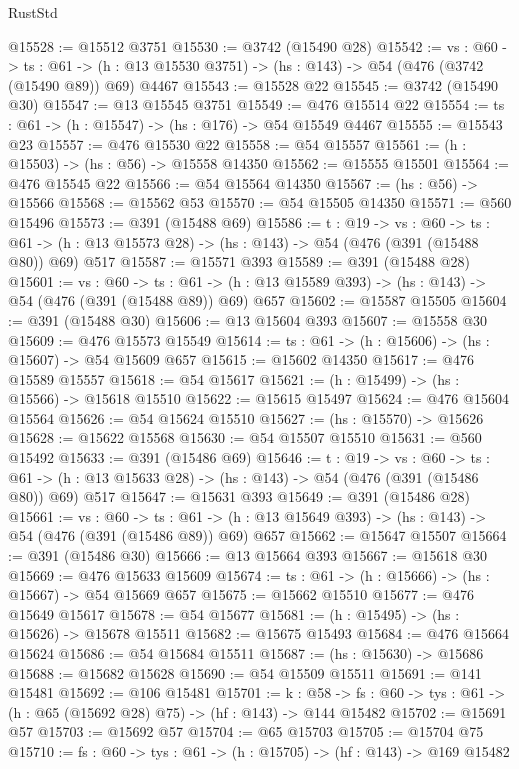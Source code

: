 \begin{lexlean}{RustStd}
\begin{coremodule}
@15528 := @15512 @3751
@15530 := @3742 (@15490 @28)
@15542 := {vs : @60} ->
  {ts : @61} -> (h : @13 @15530 @3751) -> (hs : @143) -> @54 (@476 (@3742 (@15490 @89)) @69) @4467
@15543 := @15528 @22
@15545 := @3742 (@15490 @30)
@15547 := @13 @15545 @3751
@15549 := @476 @15514 @22
@15554 := {ts : @61} -> (h : @15547) -> (hs : @176) -> @54 @15549 @4467
@15555 := @15543 @23
@15557 := @476 @15530 @22
@15558 := @54 @15557
@15561 := (h : @15503) -> (hs : @56) -> @15558 @14350
@15562 := @15555 @15501
@15564 := @476 @15545 @22
@15566 := @54 @15564 @14350
@15567 := (hs : @56) -> @15566
@15568 := @15562 @53
@15570 := @54 @15505 @14350
@15571 := @560 @15496
@15573 := @391 (@15488 @69)
@15586 := {t : @19} ->
  {vs : @60} ->
  {ts : @61} -> (h : @13 @15573 @28) -> (hs : @143) -> @54 (@476 (@391 (@15488 @80)) @69) @517
@15587 := @15571 @393
@15589 := @391 (@15488 @28)
@15601 := {vs : @60} ->
  {ts : @61} -> (h : @13 @15589 @393) -> (hs : @143) -> @54 (@476 (@391 (@15488 @89)) @69) @657
@15602 := @15587 @15505
@15604 := @391 (@15488 @30)
@15606 := @13 @15604 @393
@15607 := @15558 @30
@15609 := @476 @15573 @15549
@15614 := {ts : @61} -> (h : @15606) -> (hs : @15607) -> @54 @15609 @657
@15615 := @15602 @14350
@15617 := @476 @15589 @15557
@15618 := @54 @15617
@15621 := (h : @15499) -> (hs : @15566) -> @15618 @15510
@15622 := @15615 @15497
@15624 := @476 @15604 @15564
@15626 := @54 @15624 @15510
@15627 := (hs : @15570) -> @15626
@15628 := @15622 @15568
@15630 := @54 @15507 @15510
@15631 := @560 @15492
@15633 := @391 (@15486 @69)
@15646 := {t : @19} ->
  {vs : @60} ->
  {ts : @61} -> (h : @13 @15633 @28) -> (hs : @143) -> @54 (@476 (@391 (@15486 @80)) @69) @517
@15647 := @15631 @393
@15649 := @391 (@15486 @28)
@15661 := {vs : @60} ->
  {ts : @61} -> (h : @13 @15649 @393) -> (hs : @143) -> @54 (@476 (@391 (@15486 @89)) @69) @657
@15662 := @15647 @15507
@15664 := @391 (@15486 @30)
@15666 := @13 @15664 @393
@15667 := @15618 @30
@15669 := @476 @15633 @15609
@15674 := {ts : @61} -> (h : @15666) -> (hs : @15667) -> @54 @15669 @657
@15675 := @15662 @15510
@15677 := @476 @15649 @15617
@15678 := @54 @15677
@15681 := (h : @15495) -> (hs : @15626) -> @15678 @15511
@15682 := @15675 @15493
@15684 := @476 @15664 @15624
@15686 := @54 @15684 @15511
@15687 := (hs : @15630) -> @15686
@15688 := @15682 @15628
@15690 := @54 @15509 @15511
@15691 := @141 @15481
@15692 := @106 @15481
@15701 := {k : @58} ->
  {fs : @60} -> {tys : @61} -> (h : @65 (@15692 @28) @75) -> (hf : @143) -> @144 @15482
@15702 := @15691 @57
@15703 := @15692 @57
@15704 := @65 @15703
@15705 := @15704 @75
@15710 := {fs : @60} -> {tys : @61} -> (h : @15705) -> (hf : @143) -> @169 @15482

\end{coremodule}
\end{lexlean}
